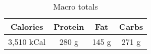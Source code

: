 \documentclass{report}
\begin{document}
\begin{multicols}{2}
\begin{enumerate}
\end{enumerate}
\begin{table}[H]
  \begin{center}
    \caption{Macro totals}
    \label{tab:table1}
    \begin{tabular}{c|c|c|c} %
      \textbf{Calories} & \textbf{Protein} & \textbf{Fat} & \textbf{Carbs}\\
      \hline
      3,510 kCal & 280 g & 145 g & 271 g\\
    \end{tabular}
  \end{center}
\end{table}
\end{multicols}




\end{document}

